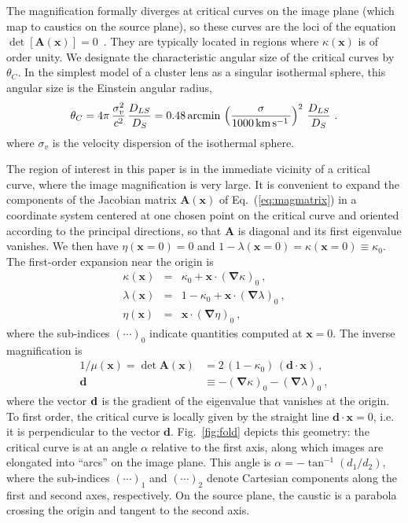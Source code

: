 \documentclass{aastex6}
\newcommand{\bt}[1]{\mathbf #1}
\newcommand{\refeq}[1]{Eq.~(\ref{eq:#1})}
\newcommand{\reffig}[1]{Fig.~\ref{fig:#1}}
\def\kms{\, {\rm km}\, {\rm s}^{-1}\, }
\newcommand{\ba}{\begin{eqnarray}}
\newcommand{\ea}{\end{eqnarray}}
\begin{document}
The magnification formally diverges at critical curves on the image plane (which map to caustics on the source plane), so these curves are the loci of the equation $\det[\bt A(\bt x)]=0$~\citep{1986ApJ...310..568B}. They are typically located in regions where $\kappa(\bt x)$ is of order unity. We designate the characteristic angular size of the critical curves by $\theta_C$. In the simplest model of a cluster lens as a singular isothermal sphere, this angular size is the Einstein angular radius,
\ba
\theta_C = 4\pi \,\frac{\sigma^2_v}{c^2}\,\frac{D_{LS}}{D_S}  = 0.48\,
 {\rm arcmin}\, \left( \frac{\sigma}{1000\kms} \right)^2\,
   \frac{D_{LS}}{D_S} ~.
\ea
where $\sigma_v$ is the velocity dispersion of the isothermal sphere.

The region of interest in this paper is in the immediate vicinity of a critical curve, where the image magnification is very large. It is convenient to expand the components of the Jacobian matrix $\bt A(\bt x)$ of \refeq{magmatrix} in a coordinate system centered at one chosen point on the critical curve and oriented according to the principal directions, so that $\bt A$ is diagonal and its first eigenvalue vanishes. We then have $\eta(\bt x=0)=0$ and $1-\lambda(\bt x=0)=\kappa(\bt x=0)\equiv \kappa_0$. The first-order expansion near the origin is
\ba
\kappa(\bt x) & = & \kappa_0 + \bt x \cdot (\bm\nabla \kappa)_0 ~, \\
\lambda(\bt x) & = & 1 - \kappa_0 + \bt x \cdot (\bm\nabla \lambda)_0 ~, \\
\eta(\bt x) & = &  \bt x \cdot (\bm\nabla \eta)_0 ~,
\ea
where the sub-indices ${(\cdots)}_0$ indicate quantities computed at $\bt x=0$. The inverse magnification is
\begin{align}
1/\mu(\bt x) = \det \bt A(\bt x) & = 2\,\left( 1-\kappa_0 \right)\,
(\bt d \cdot \bt x) ~, \label{eq:mud} \\
\bt d & \equiv -(\bm\nabla\kappa)_0 - (\bm\nabla \lambda)_0 ~, \label{eq:ddef}
\end{align}
where the vector ${\bf d}$ is the gradient of the eigenvalue that vanishes at the origin. To first order, the critical curve is locally given by the straight line $\bt d\cdot\bt x=0$, i.e. it is perpendicular to the vector $\bt d$. \reffig{fold} depicts this geometry: the critical curve is at an angle $\alpha$ relative to the first axis, along which images are elongated into ``arcs'' on the image plane. This angle is $\alpha = - \tan^{-1}(d_1/d_2)$, where the sub-indices $(\cdots)_1$ and $(\cdots)_2$ denote Cartesian components along the first and second axes, respectively. On the source plane, the caustic is a parabola crossing the origin and tangent to the second axis.
\end{document}
